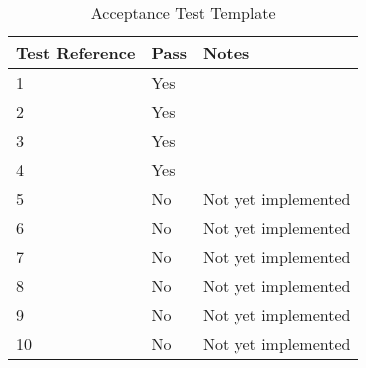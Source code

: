 \begin{table}[h]
\centering
\begin{tabular}{|l|l|l|}
\hline
\textbf{Test Reference} & \textbf{Pass} & \textbf{Notes} \\ \hline
1              & Yes              &                \\ \hline
2              & Yes              &                \\ \hline
3              & Yes              &                \\ \hline
4              & Yes              &                \\ \hline
5              & No              & Not yet implemented               \\ \hline
6              & No              & Not yet implemented               \\ \hline
7              & No              & Not yet implemented               \\ \hline
8              & No              & Not yet implemented               \\ \hline
9              & No              & Not yet implemented               \\ \hline
10             & No              & Not yet implemented               \\ \hline
\end{tabular}
\caption{Acceptance Test Template \protect {\label{tab:acc_test_1}}}
\end{table}